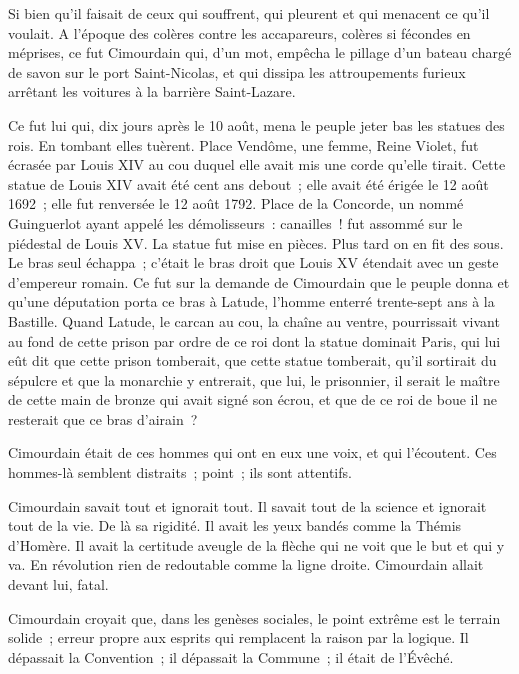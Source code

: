 \documentclass[french,twoside]{book} %
\begin{document}
Si bien qu’il faisait de ceux qui souffrent, qui pleurent et qui menacent ce qu’il voulait. A l’époque des colères contre les accapareurs, colères si fécondes en méprises, ce fut Cimourdain qui, d’un mot, empêcha le pillage d’un bateau chargé de savon sur  le port Saint-Nicolas, et qui dissipa les attroupements furieux arrêtant les voitures à la barrière Saint-Lazare.\par
Ce fut lui qui, dix jours après le 10 août, mena le peuple jeter bas les statues des rois. En tombant elles tuèrent. Place Vendôme, une femme, Reine Violet, fut écrasée par Louis XIV au cou duquel elle avait mis une corde qu’elle tirait. Cette statue de Louis XIV avait été cent ans debout ; elle avait été érigée le 12 août 1692 ; elle fut renversée le 12 août 1792. Place de la Concorde, un nommé Guinguerlot ayant appelé les démolisseurs : canailles ! fut assommé sur le piédestal de Louis XV. La statue fut mise en pièces. Plus tard on en fit des sous. Le bras seul échappa ; c’était le bras droit que Louis XV étendait avec un geste d’empereur romain. Ce fut sur la demande de Cimourdain que le peuple donna et qu’une députation porta ce bras à Latude, l’homme enterré trente-sept ans à la Bastille. Quand Latude, le carcan au cou, la chaîne au ventre, pourrissait vivant au fond de cette prison par ordre de ce roi dont la statue dominait Paris, qui lui eût dit que cette prison tomberait, que cette statue tomberait, qu’il sortirait du sépulcre et que la monarchie y entrerait, que lui, le prisonnier, il serait le maître de cette main de bronze qui avait signé son écrou, et que de ce roi de boue il ne resterait que ce bras d’airain ?\par
Cimourdain était de ces hommes qui ont en eux une voix, et qui l’écoutent. Ces hommes-là semblent distraits ; point ; ils sont attentifs.\par
 Cimourdain savait tout et ignorait tout. Il savait tout de la science et ignorait tout de la vie. De là sa rigidité. Il avait les yeux bandés comme la Thémis d’Homère. Il avait la certitude aveugle de la flèche qui ne voit que le but et qui y va. En révolution rien de redoutable comme la ligne droite. Cimourdain allait devant lui, fatal.\par
Cimourdain croyait que, dans les genèses sociales, le point extrême est le terrain solide ; erreur propre aux esprits qui remplacent la raison par la logique. Il dépassait la Convention ; il dépassait la Commune ; il était de l’Évêché.\par
\end{document}
